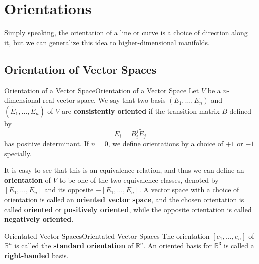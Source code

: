 \documentclass[../main.tex]{subfiles}
\begin{document}
\chapter{Orientations}\label{ch:orientations}

Simply speaking, the orientation of a line or curve is a choice of direction along it, but we can generalize this idea to higher-dimensional manifolds.

\section{Orientation of Vector Spaces}

\begin{definition}{Orientation of a Vector Space}{Orientation of a Vector Space}
  Let $V$ be a $n$-dimensional real vector space. We say that two basis $(E_1, \ldots , E_n)$ and $(\tilde{E}_1, \ldots , \tilde{E}_n)$ of $V$ are \textbf{consistently oriented} if the transition matrix $B$ defined by
  \begin{equation*}
    E_i = B^j_i \tilde{E}_j
  \end{equation*}
  has positive determinant. If $n=0$, we define orientations by a choice of $+1$ or $-1$ specially.

  It is easy to see that this is an equivalence relation, and thus we can define an \textbf{orientation} of $V$ to be one of the two equivalence classes, denoted by $[E_1, \ldots , E_n]$ and its opposite $-[E_1, \ldots , E_n]$. A vector space with a choice of orientation is called an \textbf{oriented vector space}, and the chosen orientation is called \textbf{oriented} or \textbf{positively oriented}, while the opposite orientation is called \textbf{negatively oriented}.
\end{definition}

\begin{example}{Orientated Vector Spaces}{Orientated Vector Spaces}
  The orientation $[e_1, \ldots , e_n]$ of $\mathbb{R}^n$ is called the \textbf{standard orientation} of $\mathbb{R}^n$. An oriented basis for $\mathbb{R}^3$ is called a \textbf{right-handed} basis.
\end{example}
\end{document}
